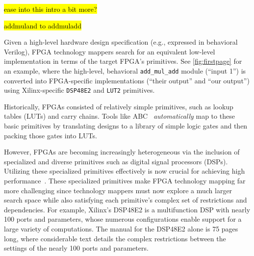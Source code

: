 

\hl{ease into this intro a bit more? }

\hl{addmuland to addmuladd}

Given a high-level hardware design specification
  (e.g., expressed in behavioral Verilog),
  FPGA technology mappers
  search for an equivalent
  low-level implementation
  in terms of the target FPGA's
  primitives.
See \cref{fig:firstpage} for an example, where
the high-level, behavioral \texttt{add\_mul\_add}
  module (``input 1'')
  is converted into FPGA-specific implementations
  (``their output'' and ``our output'')
  using Xilinx-specific
  \texttt{DSP48E2} and \texttt{LUT2} primitives.
  
Historically,
  FPGAs consisted of relatively simple
  primitives, such as
  lookup tables (LUTs) and carry chains.
Tools like
  ABC~\cite{ABC,abc2,brayton2010abc}
  \textit{automatically} 
  map to these basic primitives
  by translating designs
  to a library of simple logic gates
  and then packing those gates
  into LUTs.

However, FPGAs are becoming
  increasingly heterogeneous
  via
  the inclusion of specialized and diverse primitives
  such as digital signal processors (DSPs).
Utilizing these specialized primitives
  effectively
  is now
  crucial for achieving
  high performance~\cite{vega2021reticle}.
These specialized primitives
  make FPGA technology mapping far more challenging
  since technology mappers must now
  explore a much larger search space
  while also satisfying each primitive's
  complex set of restrictions and dependencies.
For example, Xilinx's DSP48E2
  is a multifunction 
  DSP
  with nearly
  100 ports and parameters,
  whose numerous configurations
  enable 
  support for a large variety of computations.
The manual for the DSP48E2 alone
  is 75 pages long,
  where considerable text details
  the complex restrictions
  between the settings of the nearly 100
  ports and parameters.

